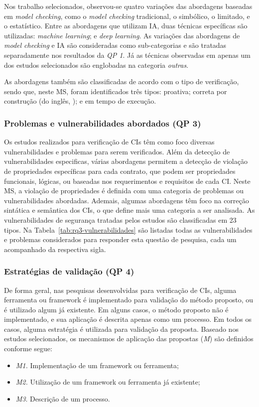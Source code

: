Nos trabalho selecionados, observou-se quatro variações das abordagens baseadas em \textit{model checking}, como o \textit{model checking} tradicional, o simbólico, o limitado, e o estatístico. Entre as abordagens que utilizam IA, duas técnicas específicas são utilizadas: \textit{machine learning}; e \textit{deep learning}. As variações das abordagens de \textit{model checking} e IA são consideradas como sub-categorias e são tratadas separadamente nos resultados da \textit{QP 1}. Já as técnicas observadas em apenas um dos estudos selecionados são englobadas na categoria \textit{outras}.

As abordagens também são classificadas de acordo com o tipo de verificação, sendo que, neste MS, foram identificados três tipos: proativa; correta por construção (do inglês, ); e em tempo de execução.

\subsubsection*{Problemas e vulnerabilidades abordados (\textbf{QP 3})}

Os estudos realizados para verificação de CIs têm como foco diversas vulnerabilidades e problemas para serem verificados. Além da detecção de vulnerabilidades especificas, várias abordagens permitem a detecção de violação de propriedades específicas para cada contrato, que podem ser propriedades funcionais, lógicas, ou baseadas nos requerimentos e requisitos de cada CI. Neste MS, a violação de propriedades é definida com uma categoria de problemas ou vulnerabilidades abordadas. Ademais, algumas abordagens têm foco na correção sintática e semântica dos CIs, o que define mais uma categoria a ser analisada. As vulnerabilidades de segurança tratadas pelos estudos são classificadas em 23 tipos. Na Tabela~\ref{tab:rq3-vulnerabilidades} são listadas todas as vulnerabilidades e problemas considerados para responder esta questão de pesquisa, cada um acompanhado da respectiva sigla.

\subsubsection*{Estratégias de validação (\textbf{QP 4})}

De forma geral, nas pesquisas desenvolvidas para verificação de CIs, alguma ferramenta ou framework é implementado para validação do método proposto, ou é utilizado algum já existente. Em alguns casos, o método proposto não é implementado, e sua aplicação é descrita apenas como um processo. Em todos os casos, alguma estratégia é utilizada para validação da proposta. Baseado nos estudos selecionados, os mecanismos de aplicação das propostas (\textit{M}) são definidos conforme segue:
\begin{itemize}
    \item \textit{M1.} Implementação de um framework ou ferramenta;
    \item \textit{M2.} Utilização de um framework ou ferramenta já existente;
    \item \textit{M3}. Descrição de um processo.
\end{itemize}

